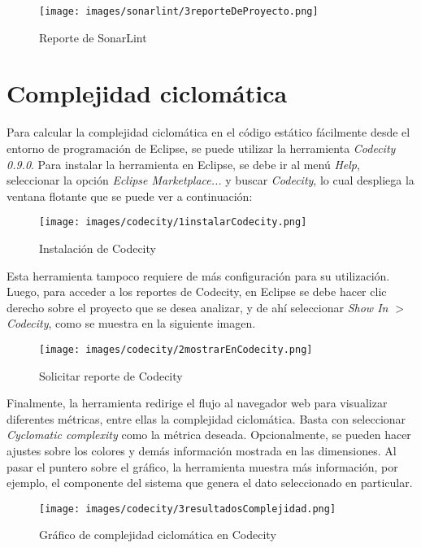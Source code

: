 \documentclass{scrreprt}
\begin{document}
\begin{figure}[H]
	\centering
    \texttt{[image: images/sonarlint/3reporteDeProyecto.png]}
    \caption{Reporte de SonarLint}
\end{figure}



\section{Complejidad ciclomática}

Para calcular la complejidad ciclomática en el código estático fácilmente desde el entorno de programación de Eclipse, se puede utilizar la herramienta \textit{Codecity 0.9.0}. Para instalar la herramienta en Eclipse, se debe ir al menú \textit{Help}, seleccionar la opción \textit{Eclipse Marketplace...} y buscar \textit{Codecity}, lo cual despliega la ventana flotante que se puede ver a continuación:

\begin{figure}[H]
	\centering
    \texttt{[image: images/codecity/1instalarCodecity.png]}
    \caption{Instalación de Codecity}
\end{figure}

Esta herramienta tampoco requiere de más configuración para su utilización. Luego, para acceder a los  reportes de Codecity, en Eclipse se debe hacer clic derecho sobre el proyecto que se desea analizar, y de ahí seleccionar \textit{Show In $>$ Codecity}, como se muestra en la siguiente imagen.

\begin{figure}[H]
	\centering
    \texttt{[image: images/codecity/2mostrarEnCodecity.png]}
    \caption{Solicitar reporte de Codecity}
\end{figure}

Finalmente, la herramienta redirige el flujo al navegador web para visualizar diferentes métricas, entre ellas la complejidad ciclomática. Basta con seleccionar \textit{Cyclomatic complexity} como la métrica deseada. Opcionalmente, se pueden hacer ajustes sobre los colores y demás información mostrada en las dimensiones. Al pasar el puntero sobre el gráfico, la herramienta muestra más información, por ejemplo, el componente del sistema que genera el dato seleccionado en particular.

\begin{figure}[H]
	\centering
    \texttt{[image: images/codecity/3resultadosComplejidad.png]}
    \caption{Gráfico de complejidad ciclomática en Codecity}
\end{figure}
\end{document}
